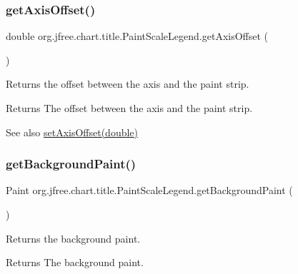 \subsubsection{\texorpdfstring{get\+Axis\+Offset()}{getAxisOffset()}}
{\footnotesize\ttfamily double org.\+jfree.\+chart.\+title.\+Paint\+Scale\+Legend.\+get\+Axis\+Offset (\begin{DoxyParamCaption}{ }\end{DoxyParamCaption})}

Returns the offset between the axis and the paint strip.

\begin{DoxyReturn}{Returns}
The offset between the axis and the paint strip.
\end{DoxyReturn}
\begin{DoxySeeAlso}{See also}
\mbox{\hyperlink{classorg_1_1jfree_1_1chart_1_1title_1_1_paint_scale_legend_aba46d6de1dca8b8adc85598dac3d93c0}{set\+Axis\+Offset(double)}} 
\end{DoxySeeAlso}
\mbox{\label{classorg_1_1jfree_1_1chart_1_1title_1_1_paint_scale_legend_a97dce120273496002e0329f0ec745f6f}} 
\subsubsection{\texorpdfstring{get\+Background\+Paint()}{getBackgroundPaint()}}
{\footnotesize\ttfamily Paint org.\+jfree.\+chart.\+title.\+Paint\+Scale\+Legend.\+get\+Background\+Paint (\begin{DoxyParamCaption}{ }\end{DoxyParamCaption})}

Returns the background paint.

\begin{DoxyReturn}{Returns}
The background paint. 
\end{DoxyReturn}
\mbox{\label{classorg_1_1jfree_1_1chart_1_1title_1_1_paint_scale_legend_ac628c770c4529240f5eb1c013cbb0438}} 
